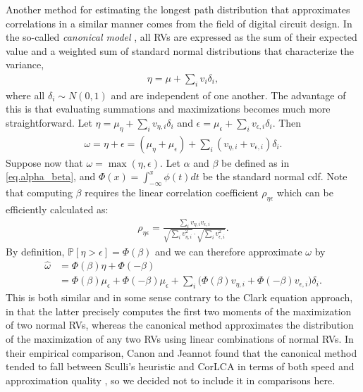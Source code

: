 \documentclass[12pt]{article}
\def\P{\mathbb{P}}
\begin{document}
Another method for estimating the longest path distribution that approximates correlations in a similar manner comes from the field of digital circuit design. In the so-called {\em canonical model} \cite{vis06,zha06}, all RVs are expressed as the sum of their expected value and a weighted sum of standard normal distributions that characterize the variance, 
\begin{align*}
\eta = \mu + \sum_i v_i \delta_i,
\end{align*}  
where all $\delta_i \sim N(0, 1)$ and are independent of one another. The advantage of this is that evaluating summations and maximizations becomes much more straightforward. Let $\eta = \mu_\eta + \sum_i v_{\eta, i} \delta_i$ and $\epsilon = \mu_\epsilon + \sum_i v_{\epsilon, i} \delta_i$. Then 
\begin{align*}
\omega = \eta + \epsilon = (\mu_\eta + \mu_\epsilon) + \sum_i (v_{\eta, i} + v_{\epsilon, i}) \delta_i.
\end{align*}
Suppose now that $\omega = \max(\eta, \epsilon)$. Let $\alpha$ and $\beta$ be defined as in \eqref{eq.alpha_beta}, and $\Phi(x) = \int_{-\infty}^{x} \phi(t) dt$ be the standard normal cdf. Note that computing $\beta$ requires the linear correlation coefficient $\rho_{\eta\epsilon}$ which can be efficiently calculated as:
\begin{align*}
\rho_{\eta\epsilon} = \frac{\sum_i v_{\eta, i} v_{\epsilon, i}}{\sqrt{\sum_i v_{\eta, i}^2} \cdot \sqrt{\sum_i v_{\epsilon, i}^2} }.
\end{align*}
By definition, $\P[\eta > \epsilon] = \Phi(\beta)$ and we can therefore approximate $\omega$ by 
\begin{align*}
\hat{\omega} &= \Phi(\beta)\eta + \Phi(-\beta) \\
&= \Phi(\beta) \mu_\epsilon + \Phi(-\beta) \mu_\epsilon + \sum_i \big( \Phi(\beta) v_{\eta, i} + \Phi(-\beta) v_{\epsilon, i} \big) \delta_i.
\end{align*}
This is both similar and in some sense contrary to the Clark equation approach, in that the latter precisely computes the first two moments of the maximization of two normal RVs, whereas the canonical method approximates the distribution of the maximization of any two RVs using linear combinations of normal RVs. In their empirical comparison, Canon and Jeannot found that the canonical method tended to fall between Sculli's heuristic and CorLCA in terms of both speed and approximation quality \cite{can16}, so we decided not to include it in comparisons here. 
\end{document}
